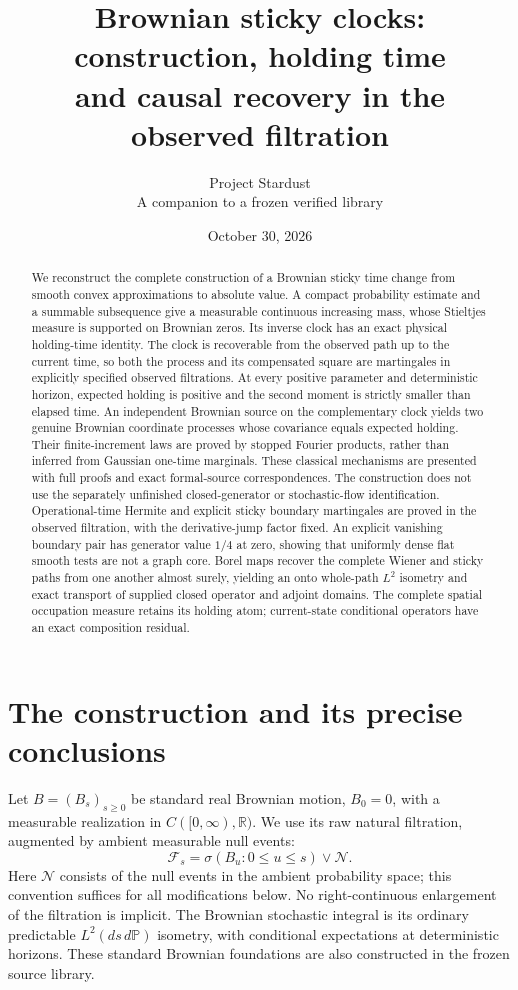 \documentclass[11pt]{article}
\title{Brownian sticky clocks: construction, holding time\protect\\
and causal recovery in the observed filtration}
\author{Project Stardust\\\small A companion to a frozen verified library}
\date{October 30, 2026}
\newcommand{\Pp}{\mathbb P}
\newcommand{\R}{\mathbb R}
\newcommand{\F}{\mathcal F}
\newcommand{\N}{\mathcal N}
\begin{document}
\maketitle
\begin{abstract}
We reconstruct the complete construction of a Brownian sticky time
change from smooth convex approximations to absolute value. A compact
probability estimate and a summable subsequence give a measurable
continuous increasing mass, whose Stieltjes measure is supported on
Brownian zeros. Its inverse clock has an exact physical holding-time
identity. The clock is recoverable from the observed path up to the
current time, so both the process and its compensated square are
martingales in explicitly specified observed filtrations. At every
positive parameter and deterministic horizon, expected holding is
positive and the second moment is strictly smaller than elapsed time.
An independent Brownian source on the complementary clock yields two
genuine Brownian coordinate processes whose covariance equals expected
holding. Their finite-increment laws are proved by stopped Fourier
products, rather than inferred from Gaussian one-time marginals.
These classical mechanisms are presented with full proofs and exact
formal-source correspondences. The construction does not use the
separately unfinished closed-generator or stochastic-flow identification.
Operational-time Hermite and explicit sticky boundary martingales are
proved in the observed filtration, with the derivative-jump factor fixed.
An explicit vanishing boundary pair has generator value $1/4$ at zero,
showing that uniformly dense flat smooth tests are not a graph core.
Borel maps recover the complete Wiener and sticky paths from one another
almost surely, yielding an onto whole-path $L^2$ isometry and exact
transport of supplied closed operator and adjoint domains.
The complete spatial occupation measure retains its holding atom;
current-state conditional operators have an exact composition residual.
\end{abstract}

\section{The construction and its precise conclusions}
Let $B=(B_s)_{s\geq0}$ be standard real Brownian motion, $B_0=0$,
with a measurable realization in $C([0,\infty),\R)$. We use its raw
natural filtration, augmented by ambient measurable null events:
\[
 \F_s=\sigma(B_u:0\leq u\leq s)\vee\N.
\]
Here $\N$ consists of the null events in the ambient probability space;
this convention suffices for all modifications below. No right-continuous
enlargement of the filtration is implicit. The Brownian stochastic
integral is its ordinary predictable $L^2(ds\,d\Pp)$ isometry, with
conditional expectations at deterministic horizons. These standard
Brownian foundations are also constructed in the frozen source library.
\end{document}
